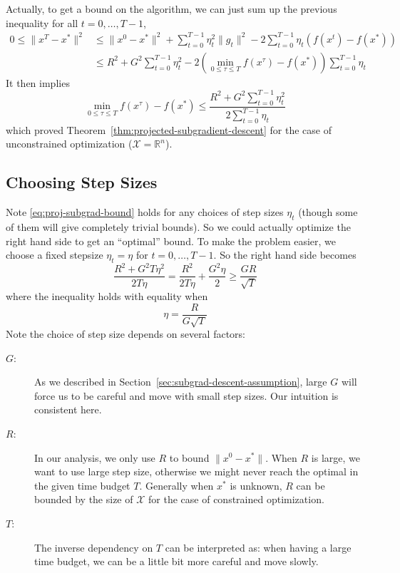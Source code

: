 \documentclass{scrartcl}
\newcommand{\RR}{\mathbb{R}}
\newcommand{\sX}{\mathcal{X}}
\begin{document}
Actually, to get a bound on the algorithm, we can just sum up the previous inequality for all
$t=0,\ldots,T-1$,
\[
  \begin{aligned}
    0\leq\|x^T-x^*\|^2
    &\leq \|x^0-x^*\|^2 + \sum_{t=0}^{T-1}\eta_t^2\|g_t\|^2 - 2\sum_{t=0}^{T-1}\eta_t \left(f(x^t)-f
    (x^*)\right) \\
    &\leq R^2 + G^2\sum_{t=0}^{T-1}\eta_t^2 -2\left(\min_{0\leq\tau\leq T}f(x^\tau) - f
    (x^*)\right)\sum_{t=0}^{T-1}\eta_t
  \end{aligned}
\]
It then implies
\begin{equation}
\min_{0\leq\tau\leq T}f(x^\tau) - f(x^*)
\leq \frac{R^2 + G^2\sum_{t=0}^{T-1}\eta_t^2}{2\sum_{t=0}^ {T-1}\eta_t}
\end{equation}
which proved Theorem~\ref{thm:projected-subgradient-descent} for the case of unconstrained
optimization ($\sX=\RR^n$).

\subsection{Choosing Step Sizes}

Note \eqref{eq:proj-subgrad-bound} holds for any choices of step sizes $\eta_t$ (though some of them
will give completely trivial bounds). So we could actually optimize the right hand side to get an
``optimal'' bound. To make the problem easier, we choose a fixed stepsize $\eta_t=\eta$ for
$t=0,\ldots,T-1$. So the right hand side becomes
\begin{equation}
  \frac{R^2+G^2T\eta^2}{2T\eta} = \frac{R^2}{2T\eta} + \frac{G^2\eta}{2} \geq \frac{GR}{\sqrt{T}}
  \label{eq:subgrad-bound-fix-eta}
\end{equation}
where the inequality holds with equality when
\begin{equation}
  \eta = \frac{R}{G\sqrt{T}}
\end{equation}
Note the choice of step size depends on several factors:
\begin{description}
  \item[$G$:] As we described in Section~\ref{sec:subgrad-descent-assumption}, large $G$ will force
  us to be careful and move with small step sizes. Our intuition is consistent here.
  \item[$R$:] In our analysis, we only use $R$ to bound $\|x^0-x^*\|$. When $R$ is large, we want to
  use large step size, otherwise we might never reach the optimal in the given time budget $T$.
  Generally when $x^*$ is unknown, $R$ can be bounded by the size of $\sX$ for the case
  of constrained optimization.
  \item[$T$:] The inverse dependency on $T$ can be interpreted as: when having a large time budget,
  we can be a little bit more careful and move slowly.
\end{description}
\end{document}
